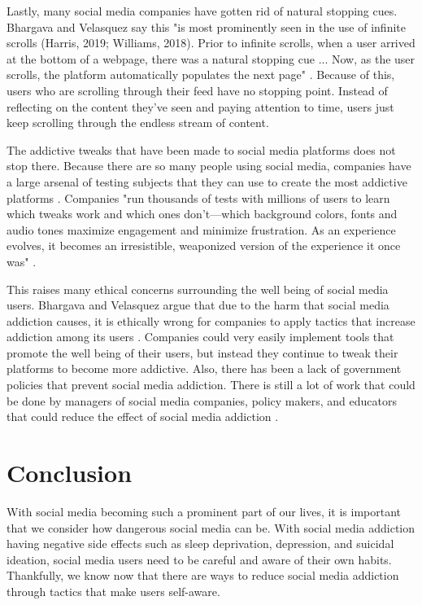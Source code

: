 \documentclass[12pt, journal, compsoc]{IEEEtran}
\begin{document}
Lastly, many social media companies have gotten rid of natural stopping cues. Bhargava and Velasquez say this "is most prominently seen in the use of infinite scrolls (Harris, 2019; Williams, 2018). Prior to infinite scrolls, when a user arrived at the bottom of a webpage, there was a natural stopping cue ... Now, as the user scrolls, the platform automatically populates the next page" \cite{Ethics}. Because of this, users who are scrolling through their feed have no stopping point. Instead of reflecting on the content they've seen and paying attention to time, users just keep scrolling through the endless stream of content.

The addictive tweaks that have been made to social media platforms does not stop there. Because there are so many people using social media, companies have a large arsenal of testing subjects that they can use to create the most addictive platforms \cite{Ethics}. Companies "run thousands of tests with millions of users to learn which tweaks work and which ones don’t—which background colors, fonts and audio tones maximize engagement and minimize frustration. As an experience evolves, it becomes an irresistible, weaponized version of the experience it once was" \cite{Ethics}.

This raises many ethical concerns surrounding the well being of social media users. Bhargava and Velasquez argue that due to the harm that social media addiction causes, it is ethically wrong for companies to apply tactics that increase addiction among its users \cite{Ethics}. Companies could very easily implement tools that promote the well being of their users, but instead they continue to tweak their platforms to become more addictive. Also, there has been a lack of government policies that prevent social media addiction. There is still a lot of work that could be done by managers of social media companies, policy makers, and educators that could reduce the effect of social media addiction \cite{Ethics}.

\section{Conclusion}

\hspace{12pt} With social media becoming such a prominent part of our lives, it is important that we consider how dangerous social media can be. With social media addiction having negative side effects such as sleep deprivation, depression, and  suicidal ideation, social media users need to be careful and aware of their own habits. Thankfully, we know now that there are ways to reduce social media addiction through tactics that make users self-aware.
\end{document}
